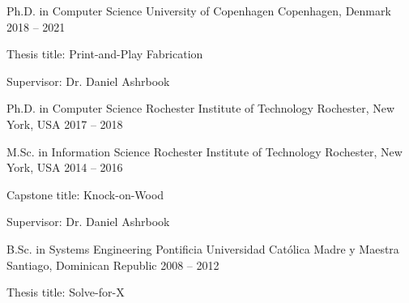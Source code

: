 
\begin{cventries}

  \cventry
    {Ph.D. in Computer Science}
    {University of Copenhagen}
    {Copenhagen, Denmark}
    {2018 -- 2021}
    {
      \begin{cvitems}
        \item{Thesis title: Print-and-Play Fabrication}
        \item{Supervisor: Dr. Daniel Ashrbook}
      \end{cvitems}
      \vspace{1em}
    }

  \cventry
    {Ph.D. in Computer Science}
    {Rochester Institute of Technology}
    {Rochester, New York, USA}
    {2017 -- 2018}
    {
    }

  \cventry
    {M.Sc. in Information Science}
    {Rochester Institute of Technology}
    {Rochester, New York, USA}
    {2014 -- 2016}
    {
      \begin{cvitems}
        \item{Capstone title: Knock-on-Wood}
        \item{Supervisor: Dr. Daniel Ashrbook}
      \end{cvitems}
      \vspace{1em}
    }

  \cventry
    {B.Sc. in Systems Engineering}
    {Pontificia Universidad Cat\'olica Madre y Maestra}
    {Santiago, Dominican Republic}
    {2008 -- 2012}
    {
      \begin{cvitems}
        \item{Thesis title: Solve-for-X}
      \end{cvitems}
    }

\end{cventries}
